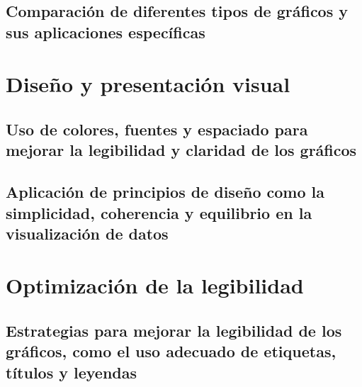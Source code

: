 \documentclass[
  a4paper,
]{article}
\begin{document}
\hypertarget{comparaciuxf3n-de-diferentes-tipos-de-gruxe1ficos-y-sus-aplicaciones-especuxedficas}{%
\subsection{Comparación de diferentes tipos de gráficos y sus
aplicaciones
específicas}\label{comparaciuxf3n-de-diferentes-tipos-de-gruxe1ficos-y-sus-aplicaciones-especuxedficas}}

\hypertarget{diseuxf1o-y-presentaciuxf3n-visual}{%
\section{Diseño y presentación
visual}\label{diseuxf1o-y-presentaciuxf3n-visual}}

\hypertarget{uso-de-colores-fuentes-y-espaciado-para-mejorar-la-legibilidad-y-claridad-de-los-gruxe1ficos}{%
\subsection{Uso de colores, fuentes y espaciado para mejorar la
legibilidad y claridad de los
gráficos}\label{uso-de-colores-fuentes-y-espaciado-para-mejorar-la-legibilidad-y-claridad-de-los-gruxe1ficos}}

\hypertarget{aplicaciuxf3n-de-principios-de-diseuxf1o-como-la-simplicidad-coherencia-y-equilibrio-en-la-visualizaciuxf3n-de-datos}{%
\subsection{Aplicación de principios de diseño como la simplicidad,
coherencia y equilibrio en la visualización de
datos}\label{aplicaciuxf3n-de-principios-de-diseuxf1o-como-la-simplicidad-coherencia-y-equilibrio-en-la-visualizaciuxf3n-de-datos}}

\hypertarget{optimizaciuxf3n-de-la-legibilidad}{%
\section{Optimización de la
legibilidad}\label{optimizaciuxf3n-de-la-legibilidad}}

\hypertarget{estrategias-para-mejorar-la-legibilidad-de-los-gruxe1ficos-como-el-uso-adecuado-de-etiquetas-tuxedtulos-y-leyendas}{%
\subsection{Estrategias para mejorar la legibilidad de los gráficos,
como el uso adecuado de etiquetas, títulos y
leyendas}\label{estrategias-para-mejorar-la-legibilidad-de-los-gruxe1ficos-como-el-uso-adecuado-de-etiquetas-tuxedtulos-y-leyendas}}
\end{document}
